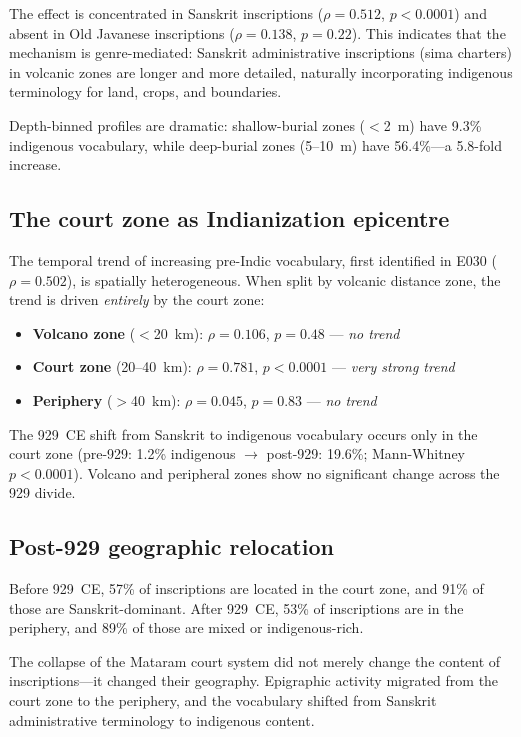 \documentclass[12pt]{article}
\begin{document}
The effect is concentrated in Sanskrit inscriptions ($\rho = 0.512$, $p < 0.0001$) and absent in Old Javanese inscriptions ($\rho = 0.138$, $p = 0.22$).
This indicates that the mechanism is genre-mediated: Sanskrit administrative inscriptions (sima charters) in volcanic zones are longer and more detailed, naturally incorporating indigenous terminology for land, crops, and boundaries.

Depth-binned profiles are dramatic: shallow-burial zones ($<$2~m) have 9.3\% indigenous vocabulary, while deep-burial zones (5--10~m) have 56.4\%---a 5.8-fold increase.

\subsection{The court zone as Indianization epicentre}

The temporal trend of increasing pre-Indic vocabulary, first identified in E030 ($\rho = 0.502$), is spatially heterogeneous.
When split by volcanic distance zone, the trend is driven \emph{entirely} by the court zone:

\begin{itemize}
    \item \textbf{Volcano zone} ($<$20~km): $\rho = 0.106$, $p = 0.48$ --- \emph{no trend}
    \item \textbf{Court zone} (20--40~km): $\rho = 0.781$, $p < 0.0001$ --- \emph{very strong trend}
    \item \textbf{Periphery} ($>$40~km): $\rho = 0.045$, $p = 0.83$ --- \emph{no trend}
\end{itemize}

The 929~CE shift from Sanskrit to indigenous vocabulary occurs only in the court zone (pre-929: 1.2\% indigenous $\rightarrow$ post-929: 19.6\%; Mann-Whitney $p < 0.0001$).
Volcano and peripheral zones show no significant change across the 929 divide.

\subsection{Post-929 geographic relocation}

Before 929~CE, 57\% of inscriptions are located in the court zone, and 91\% of those are Sanskrit-dominant.
After 929~CE, 53\% of inscriptions are in the periphery, and 89\% of those are mixed or indigenous-rich.

The collapse of the Mataram court system did not merely change the content of inscriptions---it changed their geography.
Epigraphic activity migrated from the court zone to the periphery, and the vocabulary shifted from Sanskrit administrative terminology to indigenous content.
\end{document}
